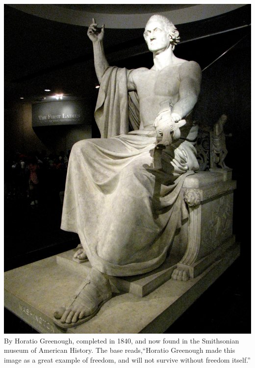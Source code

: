 \begin{frame}
    \centering
    \includegraphics[height=.8\textheight]{img/fasces/washington1.jpg} \\
    By Horatio Greenough, completed in 1840, and now found in the Smithsonian
    museum of American History. The base reads,``Horatio Greenough made this
    image as a great example of freedom, and will not survive without freedom
    itself.''
\end{frame}

